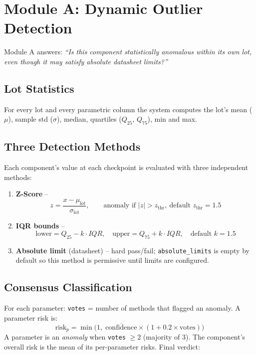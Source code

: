 \documentclass[11pt,a4paper]{article}
\newcommand{\code}[1]{\texttt{\small #1}}
\begin{document}
\section{Module A: Dynamic Outlier Detection}
\label{sec:modA}

Module A answers: \emph{``Is this component statistically anomalous within its own lot, even
though it may satisfy absolute datasheet limits?''}

\subsection{Lot Statistics}
For every lot and every parametric column the system computes the lot's
mean ($\mu$), sample std ($\sigma$), median, quartiles ($Q_{25}$, $Q_{75}$), min and max.

\subsection{Three Detection Methods}
Each component's value at each checkpoint is evaluated with three independent methods:

\begin{enumerate}[leftmargin=1.5em]
  \item \textbf{Z-Score} --
        \[ z = \frac{x - \mu_{\text{lot}}}{\sigma_{\text{lot}}},\qquad
           \text{anomaly if } |z| > z_{\text{thr}},\ \text{default } z_{\text{thr}}=1.5 \]
  \item \textbf{IQR bounds} --
        \[ \text{lower} = Q_{25} - k\cdot IQR,\quad \text{upper} = Q_{75} + k\cdot IQR,\quad
           \text{default } k = 1.5 \]
  \item \textbf{Absolute limit} (datasheet) -- hard pass/fail; \code{absolute\_limits} is empty
        by default so this method is permissive until limits are configured.
\end{enumerate}

\subsection{Consensus Classification}
For each parameter: \code{votes} = number of methods that flagged an anomaly. A parameter risk is:
\[ \text{risk}_p = \min\!\Big(1,\; \overline{\text{confidence}} \times (1 + 0.2\times\text{votes})\Big) \]
A parameter is an \emph{anomaly} when \texttt{votes} $\ge 2$ (majority of 3). The component's
overall risk is the mean of its per-parameter risks. Final verdict:
\end{document}
